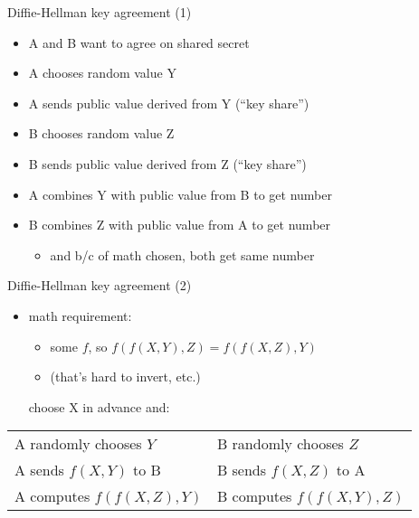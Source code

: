 \begin{frame}{Diffie-Hellman key agreement (1)}
\begin{itemize}
\item A and B want to agree on shared secret
\vspace{.5cm}
\item A chooses random value Y
\item A sends public value derived from Y (``key share'')
\item B chooses random value Z
\item B sends public value derived from Z (``key share'')
\item A combines Y with public value from B to get number
\item B combines Z with public value from A to get number
    \begin{itemize}
    \item and b/c of math chosen, both get same number
    \end{itemize}
\end{itemize}
\end{frame}

\begin{frame}{Diffie-Hellman key agreement (2)}
    \begin{itemize}
    \item math requirement:
        \begin{itemize}
        \item some $f$, so $f(f(X, Y), Z) = f(f(X, Z), Y)$
        \item (that's hard to invert, etc.)
        \end{itemize}
    choose X in advance and:
    \end{itemize}
\begin{tabular}{l|l}
A randomly chooses $Y$ & B randomly chooses $Z$ \\
A sends $f(X, Y)$ to B & B sends $f(X, Z)$ to A \\
A computes $f(f(X, Z), Y)$ & B computes $f(f(X, Y), Z)$ \\
\end{tabular}
\vspace{.5cm}
\end{frame}

